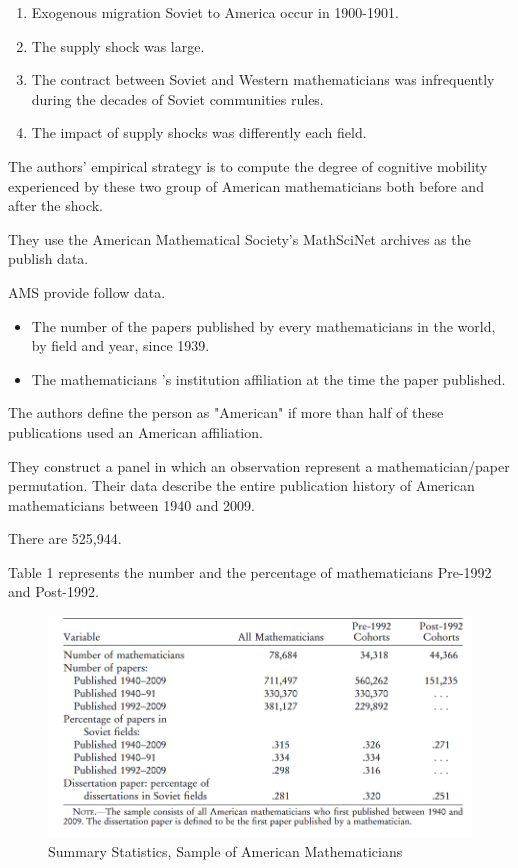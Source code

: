 \documentclass[../root]{subfiles}
\begin{document}
     \begin{enumerate}
         \item Exogenous migration Soviet to America occur in 1900-1901.
         \item The supply shock was large.
         \item The contract between Soviet and Western mathematicians was infrequently during the decades of Soviet communities rules.
         \item The impact of supply shocks was differently each field.  
     \end{enumerate}
     
     The authors' empirical strategy is to compute the degree of cognitive mobility experienced by these two group of American mathematicians both before and after the shock.
     
    They use the American Mathematical Society's MathSciNet archives as the publish data.
    
    AMS provide follow data.
    \begin{itemize}
        \item The number of the papers published by every mathematicians in the world, by field and year, since 1939.
        \item The mathematicians 's institution  affiliation at the time the paper published. 
    \end{itemize}
    
     The authors define the person as "American"  if more than half of these publications used an American affiliation. 
     
     They construct a panel in which an observation represent a mathematician/paper permutation.
     Their data describe the entire publication history of American mathematicians between 1940 and 2009. 
     
     There are 525,944.
     
     Table 1 represents the number and the percentage of mathematicians Pre-1992 and Post-1992.
    \begin{figure}
        \centering
        \includegraphics[width = \linewidth]{_images/0918sugiyama/Table_1.png}
        \caption{Summary Statistics, Sample of American Mathematicians}
        \label{fig:my_label}
    \end{figure}
    
\end{document}
